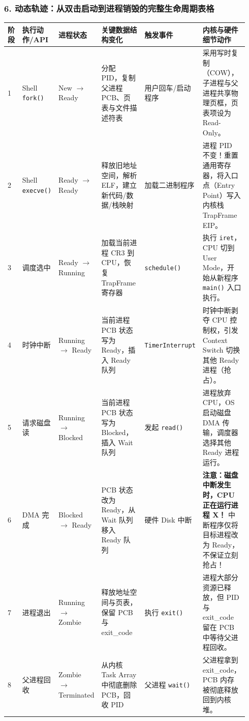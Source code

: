 \documentclass[11pt,a4paper,openany]{ctexbook}
\begin{document}
\subsubsection*{6. 动态轨迹：从双击启动到进程销毁的完整生命周期表格}
\begingroup
\small
\setlength{\tabcolsep}{2.5pt}
\begin{longtable}{p{0.07\linewidth}p{0.14\linewidth}p{0.14\linewidth}p{0.22\linewidth}p{0.17\linewidth}p{0.20\linewidth}}
\toprule
\textbf{阶段} & \textbf{执行动作/API} & \textbf{进程状态} & \textbf{关键数据结构变化} & \textbf{触发事件} & \textbf{内核与硬件细节动作} \\
\midrule
1 & Shell \texttt{fork()} & New $\rightarrow$ Ready & 分配 PID，复制父进程 PCB、页表与文件描述符表 & 用户回车/启动程序 & 采用写时复制（COW），子进程与父进程共享物理页框，页表项设为 Read-Only。 \\
\midrule
2 & Shell \texttt{execve()} & Ready $\rightarrow$ Ready & 释放旧地址空间，解析 ELF，建立新代码/数据/栈映射 & 加载二进制程序 & 进程 PID 不变！重置通用寄存器，将入口点（Entry Point）写入内核栈 TrapFrame EIP。 \\
\midrule
3 & 调度选中 & Ready $\rightarrow$ Running & 加载当前进程 CR3 到 CPU，恢复 TrapFrame 寄存器 & \texttt{schedule()} & 执行 \texttt{iret}，CPU 切到 User Mode，开始从新程序 \texttt{main()} 入口执行。 \\
\midrule
4 & 时钟中断 & Running $\rightarrow$ Ready & 当前进程 PCB 状态写为 Ready，插入 Ready 队列 & \texttt{TimerInterrupt} & 时钟中断剥夺 CPU 控制权，引发 Context Switch 切换其他 Ready 进程（抢占）。 \\
\midrule
5 & 请求磁盘读 & Running $\rightarrow$ Blocked & 当前进程 PCB 状态写为 Blocked，插入 Wait 队列 & 发起 \texttt{read()} & 进程放弃 CPU，OS 启动磁盘 DMA 传输，调度器选择其他 Ready 进程运行。 \\
\midrule
6 & DMA 完成 & Blocked $\rightarrow$ Ready & PCB 状态改为 Ready，从 Wait 队列移入 Ready 队列 & 硬件 Disk 中断 & \textbf{注意：磁盘中断发生时，CPU 正在运行进程 X！} 中断程序仅将目标进程改为 Ready，不保证立刻抢占！ \\
\midrule
7 & 进程退出 & Running $\rightarrow$ Zombie & 释放地址空间与页表，保留 PCB 与 exit\_code & 执行 \texttt{exit()} & 进程大部分资源已释放，但 PID 与 exit\_code 留在 PCB 中等待父进程回收。 \\
\midrule
8 & 父进程回收 & Zombie $\rightarrow$ Terminated & 从内核 Task Array 中彻底删除 PCB，回收 PID & 父进程 \texttt{wait()} & 父进程拿到 exit\_code，PCB 内存被彻底释放回到内核堆。 \\
\bottomrule
\end{longtable}
\endgroup
\end{document}
